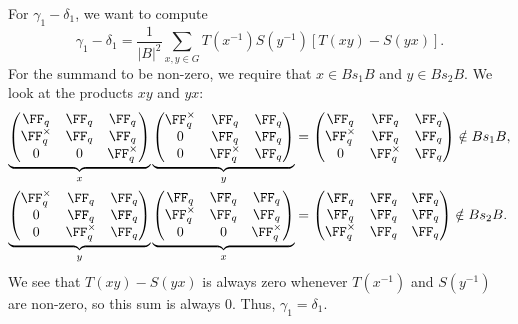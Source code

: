 \documentclass[11pt]{amsart}
\theoremstyle{remark}
\begin{document}
For $\gamma_1-\delta_1$, we want to compute
\[
	\gamma_1-\delta_1 = \frac{1}{|B|^2}\sum_{x,y\in G} T(x^{-1})S(y^{-1})[T(xy)-S(yx)].
\]
For the summand to be non-zero, we require that $x\in Bs_1B$ and $y\in Bs_2B$.
We look at the products $xy$ and $yx$:
\begin{align*}
	\underbrace{\begin{pmatrix}
			\FF_q        & \FF_q & \FF_q        \\
			\FF_q^\times & \FF_q & \FF_q        \\
			0            & 0     & \FF_q^\times
		\end{pmatrix}}_{x}
	\underbrace{\begin{pmatrix}
			\FF_q^\times & \FF_q        & \FF_q \\
			0            & \FF_q        & \FF_q \\
			0            & \FF_q^\times & \FF_q
		\end{pmatrix}}_{y} & =
	\begin{pmatrix}
		\FF_q        & \FF_q        & \FF_q \\
		\FF_q^\times & \FF_q        & \FF_q \\
		0            & \FF_q^\times & \FF_q
	\end{pmatrix} \notin Bs_1B,        \\
	\underbrace{\begin{pmatrix}
			\FF_q^\times & \FF_q        & \FF_q \\
			0            & \FF_q        & \FF_q \\
			0            & \FF_q^\times & \FF_q
		\end{pmatrix}}_{y}
	\underbrace{\begin{pmatrix}
			\FF_q        & \FF_q & \FF_q        \\
			\FF_q^\times & \FF_q & \FF_q        \\
			0            & 0     & \FF_q^\times
		\end{pmatrix}}_{x} & =
	\begin{pmatrix}
		\FF_q        & \FF_q & \FF_q \\
		\FF_q        & \FF_q & \FF_q \\
		\FF_q^\times & \FF_q & \FF_q
	\end{pmatrix}\notin Bs_2B.
\end{align*}
We see that $T(xy)-S(yx)$ is always zero whenever $T(x^{-1})$ and $S(y^{-1})$ are non-zero, so this sum is always $0$.
Thus, $\gamma_1=\delta_1$.
\end{document}
